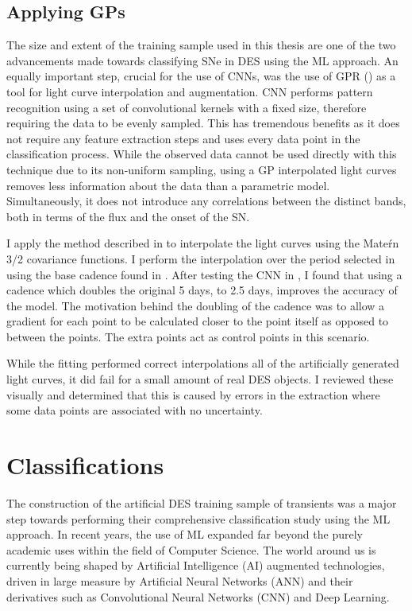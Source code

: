 \subsection{Applying GPs} \label{sec:UseGP}
The size and extent of the training sample used in this thesis are one of the two advancements made towards classifying SNe in DES using the ML approach. An equally important step, crucial for the use of CNNs, was the use of GPR () as a tool for light curve interpolation and augmentation. CNN performs pattern recognition using a set of convolutional kernels with a fixed size, therefore requiring the data to be evenly sampled. This has tremendous benefits as it does not require any feature extraction steps and uses every data point in the classification process. While the observed data cannot be used directly with this technique due to its non-uniform sampling, using a GP interpolated light curves removes less information about the data than a parametric model. Simultaneously, it does not introduce any correlations between the distinct bands, both in terms of the flux and the onset of the SN.

I apply the method described in  to interpolate the light curves using the Mate\'rn 3/2 covariance functions. I perform the interpolation over the period selected in  using the base cadence found in . After testing the CNN in , I found that using a cadence which doubles the original 5 days, to 2.5 days, improves the accuracy of the model. The motivation behind the doubling of the cadence was to allow a gradient for each point to be calculated closer to the point itself as opposed to between the points. The extra points act as control points in this scenario.

While the fitting performed correct interpolations all of the artificially generated light curves, it did fail for a small amount of real DES objects. I reviewed these visually and determined that this is caused by errors in the extraction where some data points are associated with no uncertainty.

\section{Classifications} \label{sec:CNN}
The construction of the artificial DES training sample of transients was a major step towards performing their comprehensive classification study using the ML approach. In recent years, the use of ML expanded far beyond the purely academic uses within the field of Computer Science. The world around us is currently being shaped by Artificial Intelligence (AI) augmented technologies, driven in large measure by Artificial Neural Networks (ANN) and their derivatives such as Convolutional Neural Networks (CNN) and Deep Learning.

